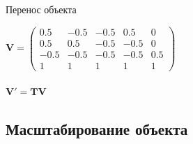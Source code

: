 \documentclass[10pt]{beamer}
\begin{document}
	\begin{frame}{Перенос объекта}
		{
		}
		{
			$\mathbf V = 
			\begin{pmatrix}
				0.5 & -0.5 &-0.5& 0.5& 0\\
				0.5 & 0.5& -0.5& -0.5 & 0\\
				-0.5& -0.5& -0.5 &-0.5& 0.5\\
				1& 1& 1& 1& 1
			\end{pmatrix}$ \\ ~ \\
			
			$\mathbf V' = \mathbf{TV}$
			
			
		}
	\end{frame}

	\subsection{Масштабирование объекта}
	
\end{document}
